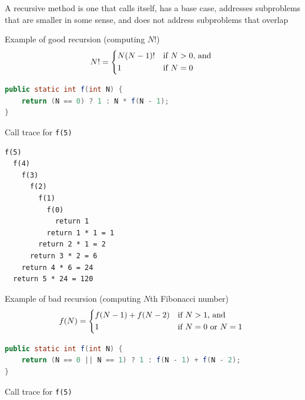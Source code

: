 \documentclass[8pt,a4paper,compress]{beamer}
\begin{document}
\begin{frame}[fragile]
\pause

A recursive method is one that calls itself, has a base case, addresses subproblems that are smaller in some sense, and does not address subproblems that overlap

\pause
\bigskip

Example of good recursion (computing $N!$)
\[
N! = \begin{dcases*}
N(N-1)! & if $N > 0$, and \\
1       & if $N=0$
\end{dcases*}
\]

\begin{lstlisting}[language=Java]
public static int f(int N) {
    return (N == 0) ? 1 : N * f(N - 1); 
}
\end{lstlisting}

Call trace for \lstinline{f(5)}
\begin{lstlisting}[language={}]
f(5)
  f(4)
    f(3)
      f(2)
        f(1)
          f(0)
            return 1
          return 1 * 1 = 1            
        return 2 * 1 = 2
      return 3 * 2 = 6
    return 4 * 6 = 24
  return 5 * 24 = 120
\end{lstlisting}
\end{frame}

\begin{frame}[fragile]
\pause

Example of bad recursion (computing $N$th Fibonacci number)
\[
f(N) = \begin{dcases*}
f(N-1) + f(N-2) & if $N > 1$, and \\
1       & if $N=0$ or $N=1$
\end{dcases*}
\]

\begin{lstlisting}[language=Java]
public static int f(int N) {
    return (N == 0 || N == 1) ? 1 : f(N - 1) + f(N - 2); 
}
\end{lstlisting}

Call trace for \lstinline{f(5)}
\begin{center}
\end{center}
\end{frame}
\end{document}
